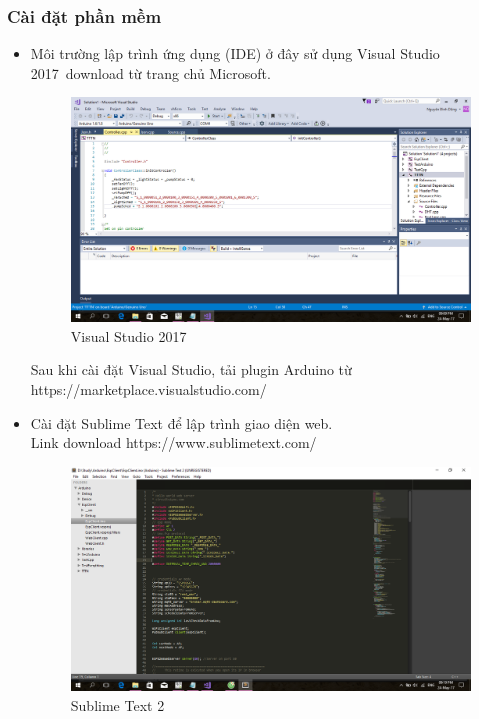 \documentclass[a4paper,12pt,oneside]{article}
\begin{document}
\subsubsection{Cài đặt phần mềm}
\begin{itemize}
\item Môi trường lập trình ứng dụng (IDE) ở đây sử dụng Visual Studio 2017\
download từ trang chủ Microsoft.
\begin{center}
\begin{figure}[h!]
\begin{center}
\includegraphics[scale=0.4]{hinh/vs.png}
\end{center}
\caption{ Visual Studio 2017}
\end{figure}
\end{center}
Sau khi cài đặt Visual Studio, tải plugin Arduino từ https://marketplace.visualstudio.com/
\item Cài đặt Sublime Text để lập trình giao diện web. \\
Link download https://www.sublimetext.com/
\begin{center}
\begin{figure}[h!]
\begin{center}
\includegraphics[scale=0.4]{hinh/sublime.png}
\end{center}
\caption{Sublime Text 2}
\end{figure}
\end{center}
\end{itemize}
\newpage
\end{document}
